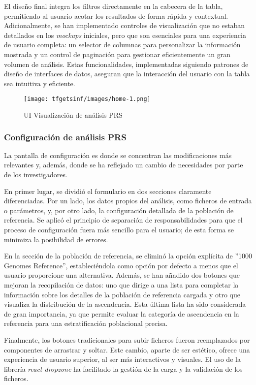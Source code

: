 El diseño final integra los filtros directamente en la cabecera de la tabla, permitiendo al usuario acotar los resultados de forma rápida y contextual. Adicionalmente, se han implementado controles de visualización que no estaban detallados en los \textit{mockups} iniciales, pero que son esenciales para una experiencia de usuario completa: un selector de columnas para personalizar la información mostrada y un control de paginación para gestionar eficientemente un gran volumen de análisis. Estas funcionalidades, implementadas siguiendo patrones de diseño de interfaces de datos, aseguran que la interacción del usuario con la tabla sea intuitiva y eficiente.

\begin{figure}[H]
    \centering
    \texttt{[image: tfgetsinf/images/home-1.png]}
    \caption{UI Visualización de análisis PRS}
    \label{fig:UIVisualización}
\end{figure}

\subsubsection{Configuración de análisis PRS}
La pantalla de configuración es donde se concentran las modificaciones más relevantes y, además, donde se ha reflejado un cambio de necesidades por parte de los investigadores.

En primer lugar, se dividió el formulario en dos secciones claramente diferenciadas. Por un lado, los datos propios del análisis, como ficheros de entrada o parámetros, y, por otro lado, la configuración detallada de la población de referencia. Se aplicó el principio de separación de responsabilidades para que el proceso de configuración fuera más sencillo para el usuario; de esta forma se minimiza la posibilidad de errores.

En la sección de la población de referencia, se eliminó la opción explícita de ''1000 Genomes Reference'', estableciéndola como opción por defecto a menos que el usuario proporcione una alternativa. Además, se han añadido dos botones que mejoran la recopilación de datos: uno que dirige a una lista para completar la información sobre los detalles de la población de referencia cargada y otro que visualiza la distribución de la ascendencia. Esta última lista ha sido considerada de gran importancia, ya que permite evaluar la categoría de ascendencia en la referencia para una estratificación poblacional precisa.

Finalmente, los botones tradicionales para subir ficheros fueron reemplazados por componentes de arrastrar y soltar. Este cambio, aparte de ser estético, ofrece una experiencia de usuario superior, al ser más interactivos y visuales. El uso de la librería \textit{react-dropzone} ha facilitado la gestión de la carga y la validación de los ficheros.

